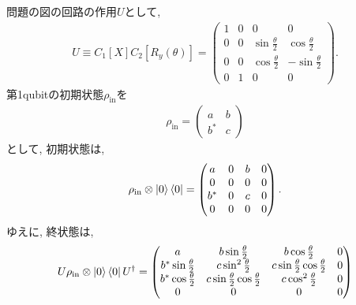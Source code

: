 \begin{ex}
    \label{ex8.20}
    問題の図の回路の作用$U$として,
    \begin{align*}
        U \equiv C_1 \left[ X \right] C_2\left[ R_y(\theta)\right]
        =
        \begin{pmatrix}
            1 & 0 & 0                     & 0                       \\
            0 & 0 & \sin \frac{\theta}{2} & \cos \frac{\theta}{2}   \\
            0 & 0 & \cos \frac{\theta}{2} & - \sin \frac{\theta}{2} \\
            0 & 1 & 0                     & 0
        \end{pmatrix}.
    \end{align*}
    第1qubitの初期状態$\rho_\mathrm{in}$を
    \begin{align*}
        \rho_\mathrm{in}
        =
        \begin{pmatrix}
            a   & b \\
            b^* & c
        \end{pmatrix}
    \end{align*}
    として, 初期状態は,
    \begin{align*}
        \rho_\mathrm{in} \otimes \ket{0}\bra{0}
        =
        \begin{pmatrix}
            a   & 0 & b & 0 \\
            0   & 0 & 0 & 0 \\
            b^* & 0 & c & 0 \\
            0   & 0 & 0 & 0
        \end{pmatrix}.
    \end{align*}
    ゆえに, 終状態は,
    \begin{align*}
        U  \rho_\mathrm{in} \otimes \ket{0}\bra{0} U^\dagger
        =
        \begin{pmatrix}
            a                         & b \sin\frac{\theta}{2}                        & b \cos \frac{\theta}{2}                       & 0 \\
            b^* \sin \frac{\theta}{2} & c \sin^2 \frac{\theta}{2}                     & c \sin \frac{\theta}{2} \cos \frac{\theta}{2} & 0 \\
            b^* \cos \frac{\theta}{2} & c \sin \frac{\theta}{2} \cos \frac{\theta}{2} & c \cos^2 \frac{\theta}{2}                     & 0 \\
            0                         & 0                                             & 0                                             & 0

\end{pmatrix}
\end{align*}
\end{ex}
